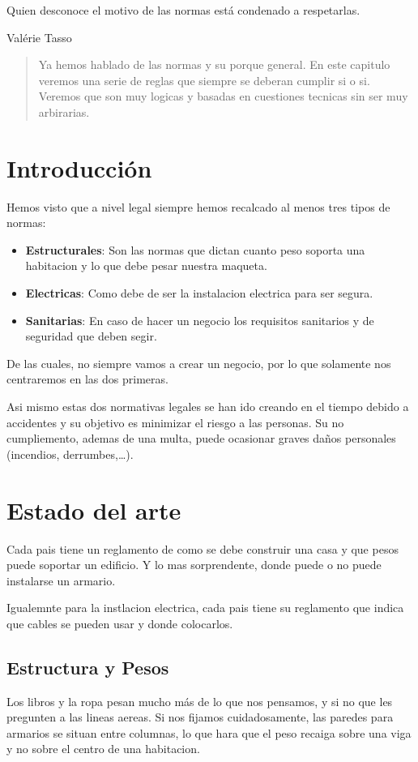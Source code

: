 
\epigraph{Quien desconoce el motivo de las normas está condenado a respetarlas.}{Valérie Tasso}

\begin{abstract}
Ya hemos hablado de las normas y su porque general. En este capitulo veremos una serie de reglas que siempre se deberan cumplir si o si. Veremos que son muy logicas y basadas en cuestiones tecnicas sin ser muy arbirarias.
\end{abstract}

\section{Introducción}
Hemos visto que a nivel legal siempre hemos recalcado al menos tres tipos de normas:
\begin{itemize}
	\item \textbf{Estructurales}: Son las normas que dictan cuanto peso soporta una habitacion y lo que debe pesar nuestra maqueta.
	\item \textbf{Electricas}: Como debe de ser la instalacion electrica para ser segura.
	\item \textbf{Sanitarias}: En caso de hacer un negocio los requisitos sanitarios y de seguridad que deben segir.
\end{itemize}
De las cuales, no siempre vamos a crear un negocio, por lo que solamente nos centraremos en las dos primeras.

Asi mismo estas dos normativas legales se han ido creando en el tiempo debido a accidentes y su objetivo es minimizar el riesgo a las personas.
Su no cumpliemento, ademas de una multa, puede ocasionar graves daños personales (incendios, derrumbes,\dots).

\section{Estado del arte}
Cada pais tiene un reglamento de como se debe construir una casa y que pesos puede soportar un edificio. Y lo mas sorprendente, donde puede o no puede instalarse un armario.

Igualemnte para la instlacion electrica, cada pais tiene su reglamento que indica que cables se pueden usar y donde colocarlos.
\subsection{Estructura y Pesos}
Los libros y la ropa pesan mucho más de lo que nos pensamos, y si no que les pregunten a las lineas aereas. Si nos fijamos cuidadosamente, las paredes para armarios se situan entre columnas, lo que hara que el peso recaiga sobre una viga y no sobre el centro de una habitacion.

